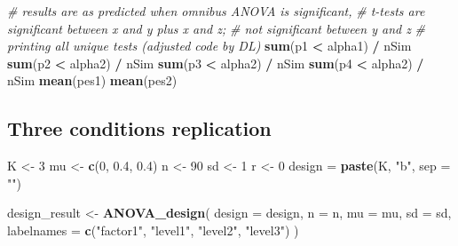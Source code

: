 \documentclass[]{book}
\newenvironment{Shaded}{\begin{snugshade}}{\end{snugshade}}
\newcommand{\CommentTok}[1]{\textcolor[rgb]{0.56,0.35,0.01}{\textit{#1}}}
\newcommand{\DataTypeTok}[1]{\textcolor[rgb]{0.13,0.29,0.53}{#1}}
\newcommand{\DecValTok}[1]{\textcolor[rgb]{0.00,0.00,0.81}{#1}}
\newcommand{\FloatTok}[1]{\textcolor[rgb]{0.00,0.00,0.81}{#1}}
\newcommand{\KeywordTok}[1]{\textcolor[rgb]{0.13,0.29,0.53}{\textbf{#1}}}
\newcommand{\NormalTok}[1]{#1}
\newcommand{\OperatorTok}[1]{\textcolor[rgb]{0.81,0.36,0.00}{\textbf{#1}}}
\newcommand{\StringTok}[1]{\textcolor[rgb]{0.31,0.60,0.02}{#1}}
\begin{document}
\begin{Shaded}
\begin{Highlighting}[]
\CommentTok{# results are as predicted when omnibus ANOVA is significant,}
\CommentTok{# t-tests are significant between x and y plus x and z; }
\CommentTok{# not significant between y and z}
\CommentTok{# printing all unique tests (adjusted code by DL)}
\KeywordTok{sum}\NormalTok{(p1 }\OperatorTok{<}\StringTok{ }\NormalTok{alpha1) }\OperatorTok{/}\StringTok{ }\NormalTok{nSim}
\KeywordTok{sum}\NormalTok{(p2 }\OperatorTok{<}\StringTok{ }\NormalTok{alpha2) }\OperatorTok{/}\StringTok{ }\NormalTok{nSim}
\KeywordTok{sum}\NormalTok{(p3 }\OperatorTok{<}\StringTok{ }\NormalTok{alpha2) }\OperatorTok{/}\StringTok{ }\NormalTok{nSim}
\KeywordTok{sum}\NormalTok{(p4 }\OperatorTok{<}\StringTok{ }\NormalTok{alpha2) }\OperatorTok{/}\StringTok{ }\NormalTok{nSim}
\KeywordTok{mean}\NormalTok{(pes1)}
\KeywordTok{mean}\NormalTok{(pes2)}
\end{Highlighting}
\end{Shaded}

\hypertarget{three-conditions-replication}{%
\subsection{Three conditions replication}\label{three-conditions-replication}}

\begin{Shaded}
\begin{Highlighting}[]
\NormalTok{K <-}\StringTok{ }\DecValTok{3}
\NormalTok{mu <-}\StringTok{ }\KeywordTok{c}\NormalTok{(}\DecValTok{0}\NormalTok{, }\FloatTok{0.4}\NormalTok{, }\FloatTok{0.4}\NormalTok{)}
\NormalTok{n <-}\StringTok{ }\DecValTok{90}
\NormalTok{sd <-}\StringTok{ }\DecValTok{1}
\NormalTok{r <-}\StringTok{ }\DecValTok{0}
\NormalTok{design =}\StringTok{ }\KeywordTok{paste}\NormalTok{(K, }\StringTok{"b"}\NormalTok{, }\DataTypeTok{sep =} \StringTok{""}\NormalTok{)}
\end{Highlighting}
\end{Shaded}

\begin{Shaded}
\begin{Highlighting}[]
\NormalTok{design_result <-}\StringTok{ }\KeywordTok{ANOVA_design}\NormalTok{(}
  \DataTypeTok{design =}\NormalTok{ design,}
  \DataTypeTok{n =}\NormalTok{ n,}
  \DataTypeTok{mu =}\NormalTok{ mu,}
  \DataTypeTok{sd =}\NormalTok{ sd,}
  \DataTypeTok{labelnames =} \KeywordTok{c}\NormalTok{(}\StringTok{"factor1"}\NormalTok{, }\StringTok{"level1"}\NormalTok{, }\StringTok{"level2"}\NormalTok{, }\StringTok{"level3"}\NormalTok{)}
\NormalTok{  )}
\end{Highlighting}
\end{Shaded}
\end{document}
